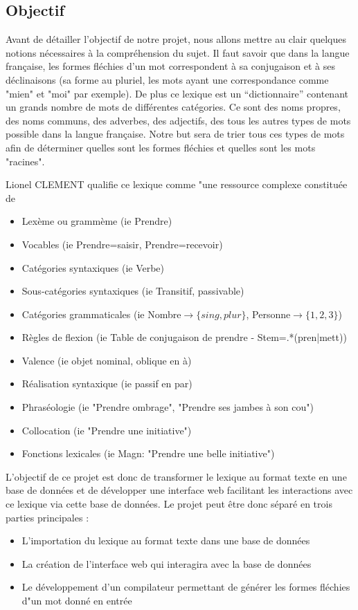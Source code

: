 \documentclass[12pt,a4paper]{article}
\begin{document}
\subsection{Objectif}
Avant de détailler l’objectif de notre projet, nous allons mettre
au clair quelques notions nécessaires à la compréhension du sujet. 
Il faut savoir que dans la langue française, les formes fléchies d'un mot correspondent à sa conjugaison et à ses déclinaisons (sa forme au pluriel, les mots ayant une correspondance comme "mien" et "moi" par exemple).
De plus ce lexique est un “dictionnaire” contenant un grands nombre de mots de différentes catégories. Ce sont des noms propres, des noms communs, des adverbes, des adjectifs, des tous les autres types de mots possible dans la langue française.
Notre but sera de trier tous ces types de mots afin de déterminer quelles sont les formes fléchies et quelles sont les mots "racines".

Lionel CLEMENT qualifie ce lexique comme "une ressource complexe constituée de
\begin{itemize}
\item Lexème ou grammème (ie Prendre)
\item Vocables (ie Prendre=saisir, Prendre=recevoir)
\item Catégories syntaxiques (ie Verbe)
\item Sous-catégories syntaxiques (ie Transitif, passivable)
\item Catégories grammaticales (ie Nombre$\rightarrow\{sing, plur\}$, Personne$\rightarrow\{1, 2, 3\}$)
\item Règles de flexion (ie Table de conjugaison de prendre - Stem=.*(pren|mett))
\item Valence (ie objet nominal, oblique en à)
\item Réalisation syntaxique (ie passif en par)
\item Phraséologie (ie "Prendre ombrage", "Prendre ses jambes à son cou")
\item Collocation (ie "Prendre une initiative")
\item Fonctions lexicales (ie Magn: "Prendre une belle initiative")
\end{itemize}

L'objectif de ce projet est donc de transformer le lexique au format texte en une base de données et de développer une interface web facilitant les interactions avec ce lexique via cette base de données.
Le projet peut être donc séparé en trois parties principales : 
\begin{itemize}
    \item L'importation du lexique au format texte dans une base de données
    \item La création de l'interface web qui interagira avec la base de données
    \item Le développement d'un compilateur permettant de générer les formes fléchies d"un mot donné en entrée
\end{itemize}
\end{document}
